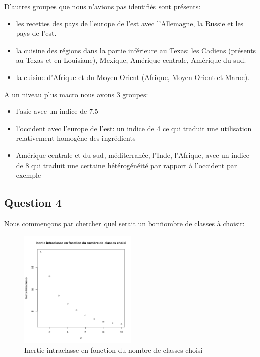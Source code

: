 \documentclass[a4paper,11pt,oneside,roman]{article}
\begin{document}
    D'autres groupes que nous n'avions pas identifiés sont présents:
    \begin{itemize}
        \item les recettes des pays de l'europe de l'est avec l'Allemagne, la Russie et les pays de l'est.
        \item la cuisine des régions dans la partie inférieure au Texas: les Cadiens (présents au Texas et en Louisiane), Mexique, Amérique centrale, Amérique du sud.
        \item la cuisine d'Afrique et du Moyen-Orient (Afrique, Moyen-Orient et Maroc).
    \end{itemize}
    
    A un niveau plus macro nous avons 3 groupes:
    \begin{itemize}
        \item l'asie avec un indice de 7.5
        \item l'occident avec l'europe de l'est: un indice de 4 ce qui traduit une utilisation relativement homogène des ingrédients
        \item Amérique centrale et du sud, méditerranée, l'Inde, l'Afrique, avec un indice de 8 qui traduit une certaine hétérogénéité par rapport à l'occident par exemple
    \end{itemize}

    \subsection*{Question 4}

    Nous commençons par chercher quel serait un \"bon\" nombre de classes à choisir:
    \begin{figure}
        \centering
        \includegraphics[width=0.5\textwidth]{imgs/K_means_choix_K.png}
        \caption{Inertie intraclasse en fonction du nombre de classes choisi}
        \label{fig_K_means_choix_K}
    \end{figure}
\end{document}
